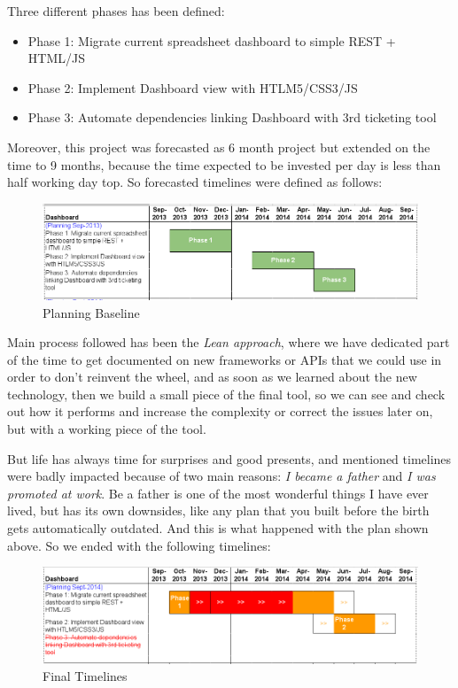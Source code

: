 \documentclass[a4paper,12pt,english]{book}
\begin{document}
Three different phases has been defined:
\begin{itemize}
	\item Phase 1: Migrate current spreadsheet dashboard to simple REST +
	HTML/JS
	\item Phase 2: Implement Dashboard view with HTLM5/CSS3/JS
	\item Phase 3: Automate dependencies linking Dashboard with 3rd ticketing
	tool
\end{itemize}

Moreover, this project was forecasted as 6 month project but extended on
the time to 9 months, because the time expected to be invested per day is less
than half working day top. So forecasted timelines were defined as follows:

\begin{figure}[ht!]
	\centering
   	\includegraphics[width=1\textwidth]{./resources/planning_baseline_12pt.png}
   	\caption{Planning Baseline}
   	\label{f_planning_baseline}
\end{figure}

Main process followed has been the \emph{Lean approach}, where we have
dedicated part of the time to get documented on new frameworks or APIs
that we could use in order to don't reinvent the wheel, and as soon as we
learned about the new technology, then we build a small piece of the final tool,
so we can see and check out how it performs and increase the complexity or
correct the issues later on, but with a working piece of the tool.

But life has always time for surprises and good presents, and mentioned
timelines were badly impacted because of two main reasons: \emph{I became a father} and
\emph{I was promoted at work}. Be a father is one of the most wonderful things
I have ever lived, but has its own downsides, like any plan that you
built before the birth gets automatically outdated. And this is what happened
with the plan shown above. So we ended with the following timelines: 

\begin{figure}[ht!]
	\centering
   	\includegraphics[width=1\textwidth]{./resources/planning_sep2014_12pt.png}
   	\caption{Final Timelines}
   	\label{f_planning_final}
\end{figure}
\end{document}
